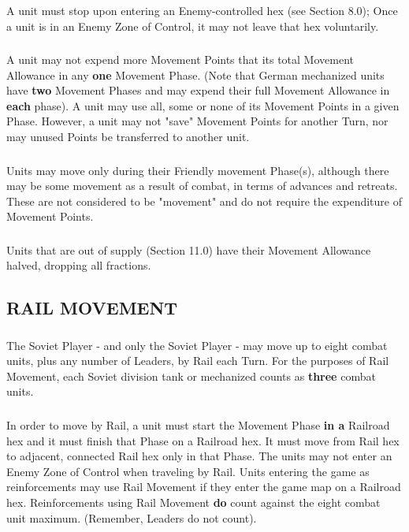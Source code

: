 \subsubsection{} A unit must stop upon entering an Enemy-controlled hex (see Section 8.0); Once a unit is in an Enemy Zone of Control, it may not leave that hex voluntarily.

\subsubsection{} A unit may not expend more Movement Points that its total Movement Allowance in any \textbf{one} Movement Phase. (Note that German mechanized units have \textbf{two} Movement Phases and may expend their full Movement Allowance in \textbf{each} phase). A unit may use all, some or none of its Movement Points in a given Phase. However, a unit may not "save" Movement Points for another Turn, nor may unused Points be transferred to another unit.

\subsubsection{} Units may move only during their Friendly movement Phase(s), although there may be some movement as a result of combat, in terms of advances and retreats. These are not considered to be "movement" and do not require the expenditure of Movement Points.

\subsubsection{} Units that are out of supply (Section 11.0) have their Movement Allowance halved, dropping all fractions.

\subsection{RAIL MOVEMENT}

\subsubsection{} The Soviet Player - and only the Soviet Player - may move up to eight combat units, plus any number of Leaders, by Rail each Turn. For the purposes of Rail Movement, each Soviet division tank or mechanized counts as \textbf{three} combat units.

\subsubsection{} In order to move by Rail, a unit must start the Movement Phase \textbf{in a} Railroad hex and it must finish that Phase on a Railroad hex. It must move from Rail hex to adjacent, connected Rail hex only in that Phase. The units may not enter an Enemy Zone of Control when traveling by Rail. Units entering the game as reinforcements may use Rail Movement if they enter the game map on a Railroad hex. Reinforcements using Rail Movement \textbf{do} count against the eight combat unit maximum. (Remember, Leaders do not count).

